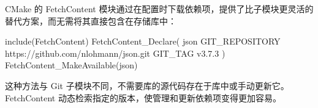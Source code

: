CMake 的 FetchContent 模块通过在配置时下载依赖项，提供了比子模块更灵活的替代方案，而无需将其直接包含在存储库中：

\begin{cmake}
include(FetchContent)
FetchContent_Declare(
    json
    GIT_REPOSITORY https://github.com/nlohmann/json.git
    GIT_TAG v3.7.3
)
FetchContent_MakeAvailable(json)
\end{cmake}

这种方法与 Git 子模块不同，不需要库的源代码存在于库中或手动更新它。 FetchContent 动态检索指定的版本，使管理和更新依赖项变得更加容易。











